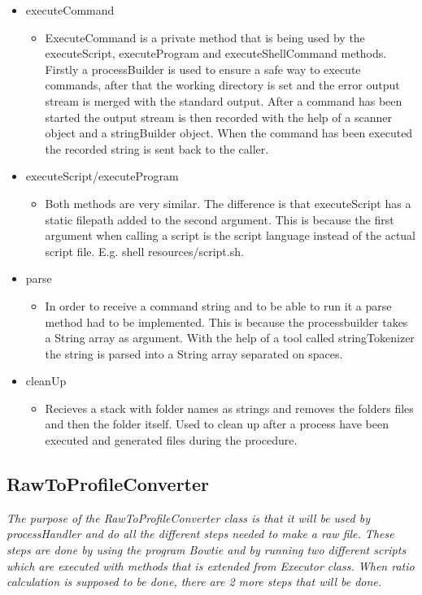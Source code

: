\begin{itemize} 
\item executeCommand
\begin{itemize}
\item ExecuteCommand is a private method that is being used by the executeScript, executeProgram and executeShellCommand methods. Firstly a processBuilder is used to ensure a safe way to execute commands, after that the working directory is set and the error output stream is merged with the standard output.
After a command has been started the output stream is then recorded with the help of a scanner object and a stringBuilder object. When the command has been executed the recorded string is sent back to the caller.
\end{itemize}
\item executeScript/executeProgram
\begin{itemize}
\item Both methods are very similar. The difference is that executeScript has a static filepath added to the second argument. This is because the first argument when calling a script is the script language instead of the actual script file. E.g. shell resources/script.sh.
\end{itemize}

\item parse
\begin{itemize}
\item In order to receive a command string and to be able to run it a parse method had to be implemented. This is because the processbuilder takes a String array as argument. With the help of a tool called stringTokenizer the string is parsed into a String array separated on spaces.
\end{itemize}
 
\item cleanUp
\begin{itemize}
\item Recieves a stack with folder names as strings and removes the folders files and then the folder itself. Used to clean up after a process have been executed and generated files during the procedure. 
\end{itemize}

\end{itemize}

\subsection{RawToProfileConverter}
\emph{The purpose of the RawToProfileConverter class is that it will be used by processHandler and do all the different steps needed to make a raw file. These steps are done by using the program Bowtie and by running two different scripts which are executed with methods that is extended from Executor class. When ratio calculation is supposed to be done, there are 2 more steps that will be done.}

